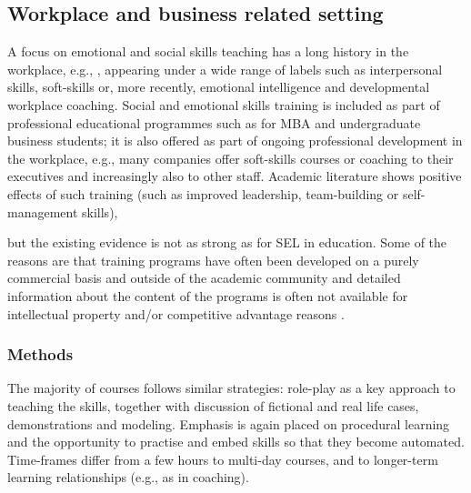 \documentclass[prodmode,acmtochi]{acmsmall}
\newcommand{\GeraldineFIX}[1]{}
\begin{document}

\subsection{Workplace and business related setting}

A focus on emotional and social skills teaching has a long history in the workplace, e.g.,  \cite{Bailey1983,Bailey1983a}, appearing under a wide range of labels such as interpersonal skills, soft-skills or, more recently, emotional intelligence and developmental workplace coaching. Social and emotional skills training is included as part of professional educational programmes such as for MBA and undergraduate business students; it is also offered as part of ongoing professional development in the workplace, e.g., many companies offer soft-skills courses or coaching to their executives and increasingly also to other staff. 
%
Academic literature shows positive effects of such training (such as improved leadership, team-building or self-management skills),
\GeraldineFIX{G: \textbf{(G:\ SUCH\ AS???)},} 
but the existing evidence is not as strong as for SEL in education. Some of the reasons are that training programs have often been developed on a purely commercial basis and outside of the academic community  and detailed information about the content of the programs is often not available for intellectual property and/or competitive advantage reasons \cite{Walter2011,Clarke2006,Riggio2003}. 




\subsubsection*{Methods} The majority of courses follows similar strategies: role-play as a key approach to teaching the skills, together with discussion of fictional and real life cases, demonstrations and modeling. Emphasis is again placed on procedural learning and the opportunity to practise and embed skills so that they become automated. Time-frames differ from a few hours to multi-day courses, and to longer-term learning relationships (e.g., as in coaching). 
\end{document}
